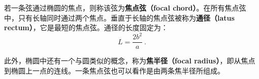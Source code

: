 若一条弦通过椭圆的焦点，则称该弦为\textbf{焦点弦（focal chord）}。在所有焦点弦中，只有长轴同时通过两个焦点。垂直于长轴的焦点弦被称为\textbf{通径（latus rectum）}，它是最短的焦点弦。通径的长度固定为：
\begin{equation}
L = \frac{2b^2}{a}~.
\end{equation}

此外，椭圆中还有一个与圆类似的概念，称为\textbf{焦半径（focal radius）}，即从焦点到椭圆上一点的连线。一条焦点弦也可以看作是由两条焦半径所组成。

